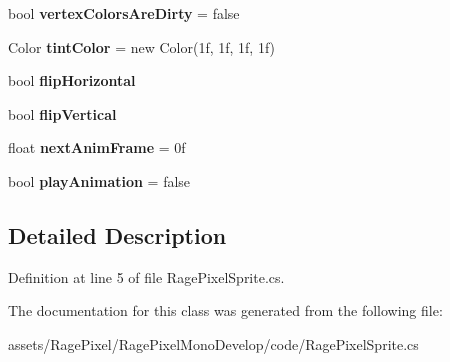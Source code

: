 \begin{DoxyCompactItemize}
\item 
\hypertarget{class_rage_pixel_sprite_a153fdf311739ac6f6f8a609147fe6496}{bool {\bfseries vertex\-Colors\-Are\-Dirty} = false}\label{class_rage_pixel_sprite_a153fdf311739ac6f6f8a609147fe6496}

\item 
\hypertarget{class_rage_pixel_sprite_a47dbafad6f1fe9f303e811edccf3ff5d}{Color {\bfseries tint\-Color} = new Color(1f, 1f, 1f, 1f)}\label{class_rage_pixel_sprite_a47dbafad6f1fe9f303e811edccf3ff5d}

\item 
\hypertarget{class_rage_pixel_sprite_af14cc6f8dcd319aad333cbdbb6b00c55}{bool {\bfseries flip\-Horizontal}}\label{class_rage_pixel_sprite_af14cc6f8dcd319aad333cbdbb6b00c55}

\item 
\hypertarget{class_rage_pixel_sprite_a2695b0925094cbef73d3aeff25f9245e}{bool {\bfseries flip\-Vertical}}\label{class_rage_pixel_sprite_a2695b0925094cbef73d3aeff25f9245e}

\item 
\hypertarget{class_rage_pixel_sprite_aec5016d6d460735781a2e2633739098e}{float {\bfseries next\-Anim\-Frame} = 0f}\label{class_rage_pixel_sprite_aec5016d6d460735781a2e2633739098e}

\item 
\hypertarget{class_rage_pixel_sprite_a58919b9ed71ac34a2a140d9b76f7b5d9}{bool {\bfseries play\-Animation} = false}\label{class_rage_pixel_sprite_a58919b9ed71ac34a2a140d9b76f7b5d9}

\end{DoxyCompactItemize}


\subsection{Detailed Description}


Definition at line 5 of file Rage\-Pixel\-Sprite.\-cs.



The documentation for this class was generated from the following file\-:\begin{DoxyCompactItemize}
\item 
assets/\-Rage\-Pixel/\-Rage\-Pixel\-Mono\-Develop/code/Rage\-Pixel\-Sprite.\-cs\end{DoxyCompactItemize}
